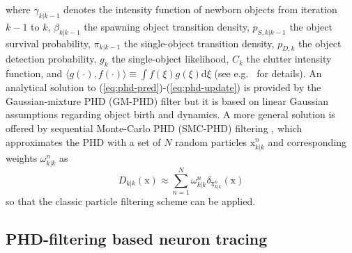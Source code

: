 \documentclass[noinfo,nocrop,final]{bioinfo}
\begin{document}
where $\gamma_{k|k-1}$ denotes the intensity function of newborn objects from iteration $k-1$ to $k$, $\beta_{k|k-1}$ the spawning object transition density, $p_{S,k|k-1}$ the object survival probability, $\pi_{k|k-1}$ the single-object transition density, $p_{D,k}$ the object detection probability, $g_k$ the single-object likelihood, $C_k$ the clutter intensity function, and $\langle g(\cdot),f(\cdot) \rangle \equiv \int\!f(\xi)g(\xi)\mathrm{d}\xi$ (see e.g.\ \citet{vo2006gaussian} for details). An analytical solution to (\ref{eq:phd-pred})-(\ref{eq:phd-update}) is provided by the Gaussian-mixture PHD (GM-PHD) filter \citep{vo2006gaussian} but it is based on linear Gaussian assumptions regarding object birth and dynamics. A more general solution is offered by sequential Monte-Carlo PHD (SMC-PHD) filtering \citep{vo2005sequential, ristic2010improved, zajic2003particle}, which approximates the PHD with a set of $N$ random particles $\mathrm{x}_{k|k}^{n}$ and corresponding weights $\omega_{k|k}^{n}$ as
\begin{equation}
\label{eq:smc-approx}
D_{k|k}(\mathrm{x}) \approx \sum\limits_{n=1}^{N} \omega_{k|k}^{n} \delta_{\mathrm{x}_{k|k}^{n}}\!(\mathrm{x})
\end{equation}
so that the classic particle filtering scheme \citep{doucet2000sequential, arulampalam2002tutorial, ristic2004beyond} can be applied.

\subsection{PHD-filtering based neuron tracing}
\label{ssec:proposed-neur-trac-meth}
\end{document}
